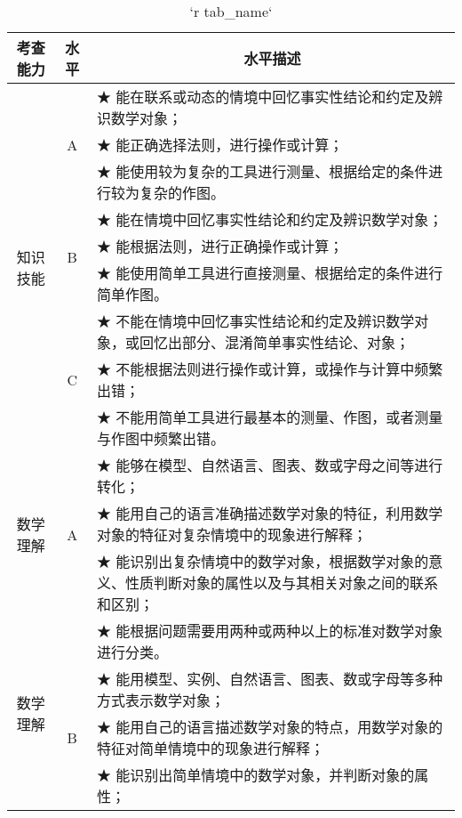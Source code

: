 \begin{itshape}
\mytable
\begin{longtable}{|c|c|p{12cm}|}
\caption{`r tab_name`} \label{tab: `r tab_name`} \\
 
\hline
 \multicolumn{1}{|c}{\normalsize 考查能力} &  \multicolumn{1}{|c|}{\normalsize 水平} &  \multicolumn{1}{c|}{\normalsize 水平描述} \\ 
\hline
   
   \multirow{9}{*}{知识技能}  & \multirow{3}{*}{A}  & ★ 能在联系或动态的情境中回忆事实性结论和约定及辨识数学对象；  \\    
   & &  ★ 能正确选择法则，进行操作或计算； \\  
   & &  ★ 能使用较为复杂的工具进行测量、根据给定的条件进行较为复杂的作图。 \\    
\cline{2-3}      

   &   \multirow{3}{*}{B}  &  ★ 能在情境中回忆事实性结论和约定及辨识数学对象；\\  
   & &  ★ 能根据法则，进行正确操作或计算；\\  
   & &  ★ 能使用简单工具进行直接测量、根据给定的条件进行简单作图。 \\    
\cline{2-3}      

   &   \multirow{3}{*}{C}  &  ★ 不能在情境中回忆事实性结论和约定及辨识数学对象，或回忆出部分、混淆简单事实性结论、对象；\\  
   & &  ★ 不能根据法则进行操作或计算，或操作与计算中频繁出错；\\  
   & &  ★ 不能用简单工具进行最基本的测量、作图，或者测量与作图中频繁出错。 \\   
\hline
   
   \multirow{3}{*}{数学理解}  & \multirow{3}{*}{A}  & ★   能够在模型、自然语言、图表、数或字母之间等进行转化； \\    
   & &  ★ 能用自己的语言准确描述数学对象的特征，利用数学对象的特征对复杂情境中的现象进行解释； \\  
   & &  ★ 能识别出复杂情境中的数学对象，根据数学对象的意义、性质判断对象的属性以及与其相关对象之间的联系和区别；\\    
   \multirow{9}{*}{数学理解} & &  ★ 能根据问题需要用两种或两种以上的标准对数学对象进行分类。\\    
\cline{2-3}      

   &   \multirow{4}{*}{B}  &  ★ 能用模型、实例、自然语言、图表、数或字母等多种方式表示数学对象；\\  
   & &  ★   能用自己的语言描述数学对象的特点，用数学对象的特征对简单情境中的现象进行解释；\\  
   & &  ★ 能识别出简单情境中的数学对象，并判断对象的属性； \\ 
   

\end{longtable}
\end{itshape}
